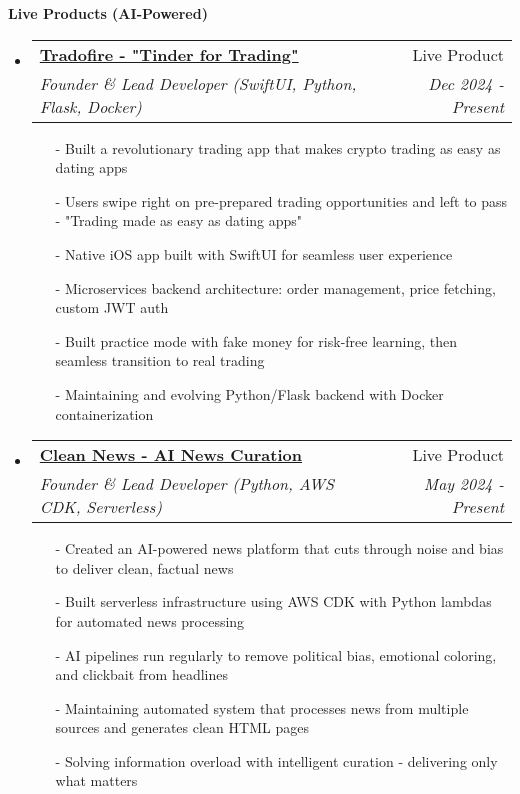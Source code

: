 \documentclass[letterpaper,11pt]{article}
\makeatletter
\newcommand{\resheading}[1]{{\large \colorbox{mygrey}{\begin{minipage}{\textwidth}{\textbf{#1 \vphantom{p\^{E}}}}\end{minipage}}}}
\newcommand{\ressubheading}[4]{
\begin{tabular*}{7.0in}{l@{\extracolsep{\fill}}r}
    \textbf{#1} & #2 \\
    \textit{#3} & \textit{#4} \\
\end{tabular*}\vspace{-6pt}}
\makeatother
\begin{document}
\resheading{Live Products (AI-Powered)}
\begin{itemize}
\item
    \ressubheading{\href{https://tradofire.com}{Tradofire - "Tinder for Trading"}}{Live Product}{Founder \& Lead Developer (SwiftUI, Python, Flask, Docker)}{Dec 2024 - Present}
    \begin{itemize}
        \item[-]{Built a revolutionary trading app that makes crypto trading as easy as dating apps}
        \item[-]{Users swipe right on pre-prepared trading opportunities and left to pass - "Trading made as easy as dating apps"}
        \item[-]{Native iOS app built with SwiftUI for seamless user experience}
        \item[-]{Microservices backend architecture: order management, price fetching, custom JWT auth}
        \item[-]{Built practice mode with fake money for risk-free learning, then seamless transition to real trading}
        \item[-]{Maintaining and evolving Python/Flask backend with Docker containerization}
    \end{itemize}

\item
    \ressubheading{\href{https://cleannews.fyi}{Clean News - AI News Curation}}{Live Product}{Founder \& Lead Developer (Python, AWS CDK, Serverless)}{May 2024 - Present}
    \begin{itemize}
        \item[-]{Created an AI-powered news platform that cuts through noise and bias to deliver clean, factual news}
        \item[-]{Built serverless infrastructure using AWS CDK with Python lambdas for automated news processing}
        \item[-]{AI pipelines run regularly to remove political bias, emotional coloring, and clickbait from headlines}
        \item[-]{Maintaining automated system that processes news from multiple sources and generates clean HTML pages}
        \item[-]{Solving information overload with intelligent curation - delivering only what matters}
    \end{itemize}
\end{itemize}

\vspace{0.2in}
\end{document}
